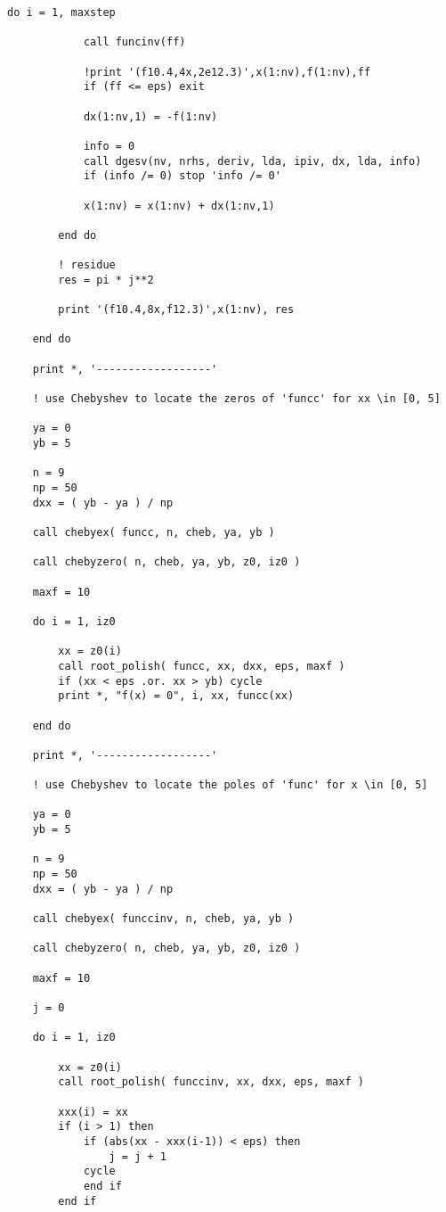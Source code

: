 \documentclass[12pt]{article}
\begin{document}
\begin{lstlisting}[frame=single,caption={{\tt Fortran 90} Code {\tt zeros.f90}},label=zeros]
        do i = 1, maxstep

            call funcinv(ff)

            !print '(f10.4,4x,2e12.3)',x(1:nv),f(1:nv),ff
            if (ff <= eps) exit

            dx(1:nv,1) = -f(1:nv)

            info = 0
            call dgesv(nv, nrhs, deriv, lda, ipiv, dx, lda, info)
            if (info /= 0) stop 'info /= 0'

            x(1:nv) = x(1:nv) + dx(1:nv,1)

        end do

        ! residue
        res = pi * j**2

        print '(f10.4,8x,f12.3)',x(1:nv), res

    end do

    print *, '------------------'

    ! use Chebyshev to locate the zeros of 'funcc' for xx \in [0, 5]

    ya = 0
    yb = 5

    n = 9
    np = 50
    dxx = ( yb - ya ) / np

    call chebyex( funcc, n, cheb, ya, yb )

    call chebyzero( n, cheb, ya, yb, z0, iz0 )

    maxf = 10

    do i = 1, iz0

        xx = z0(i)
        call root_polish( funcc, xx, dxx, eps, maxf )
        if (xx < eps .or. xx > yb) cycle
        print *, "f(x) = 0", i, xx, funcc(xx) 

    end do

    print *, '------------------'

    ! use Chebyshev to locate the poles of 'func' for x \in [0, 5]

    ya = 0
    yb = 5

    n = 9
    np = 50
    dxx = ( yb - ya ) / np

    call chebyex( funccinv, n, cheb, ya, yb )

    call chebyzero( n, cheb, ya, yb, z0, iz0 )

    maxf = 10

    j = 0

    do i = 1, iz0

        xx = z0(i)
        call root_polish( funccinv, xx, dxx, eps, maxf )

        xxx(i) = xx
        if (i > 1) then
            if (abs(xx - xxx(i-1)) < eps) then
                j = j + 1
            cycle
            end if
        end if


\end{lstlisting}
\end{document}
